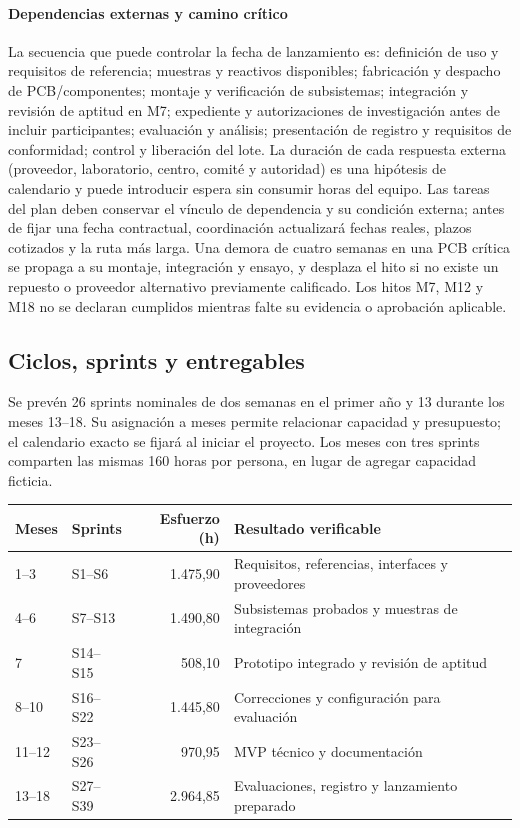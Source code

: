 \paragraph{Dependencias externas y camino crítico}
La secuencia que puede controlar la fecha de lanzamiento es: definición de uso y requisitos de referencia; muestras y reactivos disponibles; fabricación y despacho de PCB/componentes; montaje y verificación de subsistemas; integración y revisión de aptitud en M7; expediente y autorizaciones de investigación antes de incluir participantes; evaluación y análisis; presentación de registro y requisitos de conformidad; control y liberación del lote. La duración de cada respuesta externa (proveedor, laboratorio, centro, comité y autoridad) es una hipótesis de calendario y puede introducir espera sin consumir horas del equipo. Las tareas del plan deben conservar el vínculo de dependencia y su condición externa; antes de fijar una fecha contractual, coordinación actualizará fechas reales, plazos cotizados y la ruta más larga. Una demora de cuatro semanas en una PCB crítica se propaga a su montaje, integración y ensayo, y desplaza el hito si no existe un repuesto o proveedor alternativo previamente calificado. Los hitos M7, M12 y M18 no se declaran cumplidos mientras falte su evidencia o aprobación aplicable.

\subsection{Ciclos, sprints y entregables}
Se prevén 26 sprints nominales de dos semanas en el primer año y 13 durante los meses 13--18. Su asignación a meses permite relacionar capacidad y presupuesto; el calendario exacto se fijará al iniciar el proyecto. Los meses con tres sprints comparten las mismas 160 horas por persona, en lugar de agregar capacidad ficticia.

\begin{center}\small
\begin{tabularx}{\linewidth}{l l r X}\toprule
Meses & Sprints & Esfuerzo (h) & Resultado verificable\\\midrule
1--3 & S1--S6 & 1.475,90 & Requisitos, referencias, interfaces y proveedores\\
4--6 & S7--S13 & 1.490,80 & Subsistemas probados y muestras de integración\\
7 & S14--S15 & 508,10 & Prototipo integrado y revisión de aptitud\\
8--10 & S16--S22 & 1.445,80 & Correcciones y configuración para evaluación\\
11--12 & S23--S26 & 970,95 & MVP técnico y documentación\\
13--18 & S27--S39 & 2.964,85 & Evaluaciones, registro y lanzamiento preparado\\
\bottomrule\end{tabularx}\end{center}

